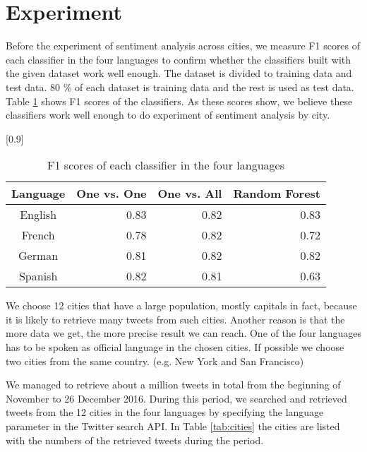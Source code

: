 \documentclass[twocolumn]{article}
\begin{document}
\vspace{-6mm}

\section{Experiment}
\vspace{-2mm}
Before the experiment of sentiment analysis across cities, we measure F1 scores of each classifier in the four languages to confirm whether the classifiers built with the given dataset work well enough.
The dataset is divided to training data and test data.
80 \% of each dataset is training data and the rest is used as test data.
Table \ref{tab:f1score} shows F1 scores of the classifiers.
As these scores show, we believe these classifiers work well enough to do experiment of sentiment analysis by city.

\begin{table}[ht]
	\caption{F1 scores of each classifier in the four languages}
	\scalebox{0.8}[0.9]{
	\begin{tabular}{|c|r|r|r|} \hline
	Language&One vs. One&One vs. All&Random Forest\\ \hline \hline
	English & 0.83 & 0.82 & 0.83  \\ \hline
	French & 0.78 & 0.82 & 0.72  \\ \hline
	German & 0.81 & 0.82 & 0.82 \\ \hline
	Spanish & 0.82 & 0.81 & 0.63  \\ \hline
	\end{tabular}
	}
	\label{tab:f1score}
\end{table}

We choose 12 cities that have a large population, mostly capitals in fact, because it is likely to retrieve many tweets from such cities.
Another reason is that the more data we get, the more precise result we can reach.
One of the four languages has to be spoken as official language in the chosen cities.
If possible we choose two cities from the same country. (e.g. New York and San Francisco)

We managed to retrieve about a million tweets in total from the beginning of November to 26 December 2016.
During this period, we searched and retrieved tweets from the 12 cities in the four languages by specifying the language parameter in the Twitter search API.
In Table \ref{tab:cities} the cities are listed with the numbers of the retrieved tweets during the period.
\end{document}
